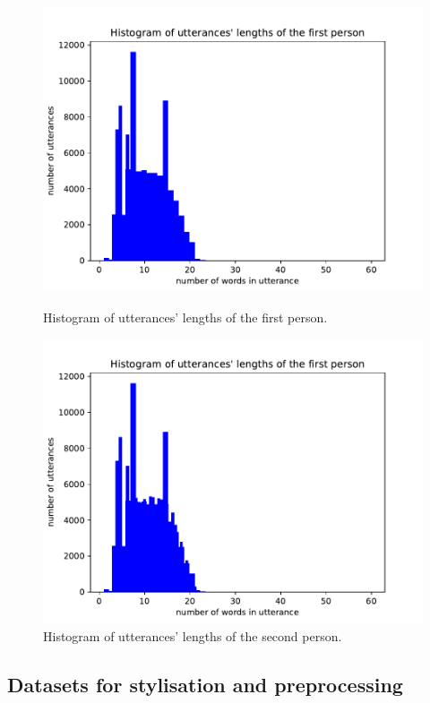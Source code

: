 \begin{figure}[htb]
  \includegraphics[width=\linewidth]{figures/uttr1_length.pdf}
  \caption{Histogram of utterances' lengths of the first person.}\label{fig:histogram_uttr1_length}
\endminipage\hfill
{}
  \includegraphics[width=\linewidth]{figures/uttr2_length.pdf}
  \caption{Histogram of utterances' lengths of the second person.}\label{fig:histogram_uttr2_length}
\endminipage
\end{figure}


\subsection{Datasets for stylisation and preprocessing}


